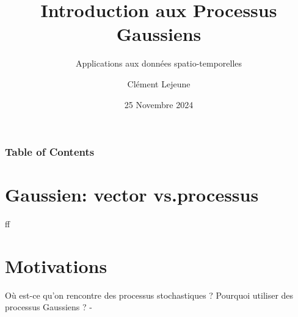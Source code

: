 \documentclass[xcolor=svgnames, t]{beamer}
\title[Introduction aux Processus Gaussiens]{Introduction aux Processus Gaussiens}
\subtitle{Applications aux données spatio-temporelles}
\institute[]{}
\author[Cl\'ement Lejeune]{Cl\'ement Lejeune}
\institute[TSN/AD/AD3/IA]{
Thales Services Numériques,
\\ AD/AD3/IA
}
\date{25 Novembre 2024}
\begin{document}
\frame{\titlepage}

{
  \begin{frame}
    \frametitle{Table of Contents}
    \tableofcontents[currentsection]
  \end{frame}
}

\section{Gaussien: vector vs.processus}
\begin{frame}
  ff
\end{frame}

\section{Motivations}
Où est-ce qu'on rencontre des processus stochastiques ?
Pourquoi utiliser des processus Gaussiens ?
- 
\end{document}
